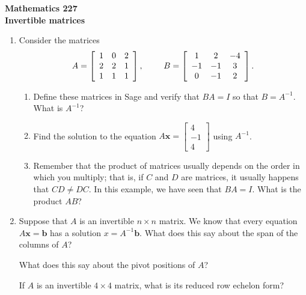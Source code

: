 \documentclass[12pt]{article}
\newcommand{\vs}[1]{\vspace{#1in}}
\newcommand{\bvec}{{\mathbf b}}
\newcommand{\xvec}{{\mathbf x}}
\newcommand{\threevec}[3]{\left[\begin{array}{r}#1 \\ #2 \\ #3
  \end{array}\right]}
\begin{document}
\noindent
{\bf Mathematics 227} \\ 
{\bf Invertible matrices}

\bigskip
\begin{enumerate}
\item Consider the matrices
  $$
  A =
  \left[
    \begin{array}{ccc}
      1 & 0 & 2 \\
      2 & 2 & 1 \\
      1 & 1 & 1 \\
    \end{array}\right],
  \hspace*{24pt}
  B =
  \left[
    \begin{array}{ccc}
      1 & 2 & -4 \\
      -1 & -1 & 3 \\
      0 & -1 & 2 \\
    \end{array}\right].
  $$

  \begin{enumerate}[label=(\alph*)]
  \item Define these matrices in Sage and verify that $BA = I$ so that
    $B=A^{-1}$.  What is $A^{-1}$?

    \vs{1}
  \item Find the solution to the equation $A\xvec =
    \threevec{4}{-1}{4}$ using $A^{-1}$.

    \vs{1}
  \item Remember that the product of matrices usually depends on the
    order in which you multiply;  that is, if $C$ and $D$ are
    matrices, it usually happens that $CD \neq DC$.  In this example,
    we have seen that $BA = I$.  What is the product $AB$?

    \vs{1}
  \end{enumerate}

  
  \item Suppose that $A$ is an invertible $n\times n$ matrix.  We know
    that every equation $A\xvec = \bvec$ has a solution $x =
    A^{-1}\bvec$.  What does this say about the span of the columns of
    $A$?

    \vs{1}
    What does this say about the pivot positions of $A$?

    \vs{1}
    If $A$ is an invertible $4\times4$ matrix, what is its reduced
    row echelon form?


\end{enumerate}
\end{document}
